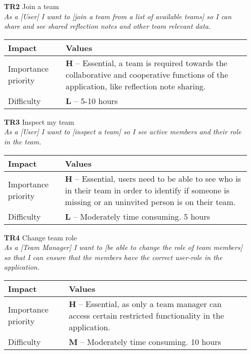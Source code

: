 \begin{itemize}
    \item[\textbf{TR2}] Join a team\\
        \textit{\small{As a [User] I want to [join a team from a list of available teams] so I can share and see shared reflection notes and other team relevant data.}}

        \begin{tabular}{| l | p{8cm} |}
            \hline
            \rowcolor[gray]{0.8}
            \textbf{Impact} & \textbf{Values} \\
            \hline
            Importance priority & \textbf{H} -- Essential, a team is required towards the collaborative and cooperative functions of the application, like reflection note sharing.\\
            Difficulty & \textbf{L} -- 5-10 hours\\
            \hline
        \end{tabular}
    \vspace{0.5cm}

    \item[\textbf{TR3}] Inspect my team\\
        \textit{\small{As a [User] I want to [inspect a team] so I see active members and their role in the team.}}

        \begin{tabular}{| l | p{8cm} |}
            \hline
            \rowcolor[gray]{0.8}
            \textbf{Impact} & \textbf{Values} \\
            \hline
            Importance priority & \textbf{H} -- Essential, users need to be able to see who is in their team in order to identify if someone is missing or an uninvited person is on their team.\\
            Difficulty & \textbf{L} -- Moderately time consuming. 5 hours\\
            \hline
        \end{tabular}
    \vspace{0.5cm}

    \item[\textbf{TR4}] Change team role\\
        \textit{\small{As a [Team Manager] I want to [be able to change the role of team members] so that I can ensure that the members have the correct user-role in the application.}}

        \begin{tabular}{| l | p{8cm} |}
            \hline
            \rowcolor[gray]{0.8}
            \textbf{Impact} & \textbf{Values} \\
            \hline
            Importance priority & \textbf{H} -- Essential, as only a team manager can access certain restricted functionality in the application.\\
            Difficulty & \textbf{M} -- Moderately time consuming. 10 hours\\
            \hline
        \end{tabular}
    \vspace{0.5cm}


\end{itemize}
